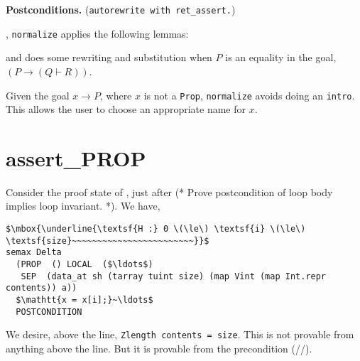 \documentclass[12pt,fleqn,openany,oneside,showtrims]{memoir}
\begin{document}
\textbf{Postconditions.} (\lstinline{autorewrite with ret_assert.})

,
\lstinline{normalize} applies the following lemmas:
and does some rewriting and substitution
when $P$ is an equality in the goal,
$(P \rightarrow (Q\vdash R))$.

Given the goal $x \rightarrow P$, where $x$ is not
a \lstinline{Prop}, \lstinline{normalize} avoids
doing an \lstinline{intro}.  This allows the user
to choose an appropriate name for $x$.

\chapter{assert\_PROP}
\label{refcard:assert-PROP}
Consider the proof state of ,
just after \textsf{(* Prove postcondition of loop body implies loop invariant. *)}.  We have,

\begin{lstlisting}
$\mbox{\underline{\textsf{H :} 0 \(\le\) \textsf{i} \(\le\) \textsf{size}~~~~~~~~~~~~~~~~~~~~~~~~}}$
semax Delta
  (PROP  () LOCAL  ($\ldots$)
   SEP  (data_at sh (tarray tuint size) (map Vint (map Int.repr contents)) a))
  $\mathtt{x = x[i];}~\ldots$
  POSTCONDITION
\end{lstlisting}
We desire, above the line, \lstinline{Zlength contents = size}.  This is not provable from anything above the line.  But it is provable from the precondition (\PROP/\LOCAL/\SEP).
\end{document}
